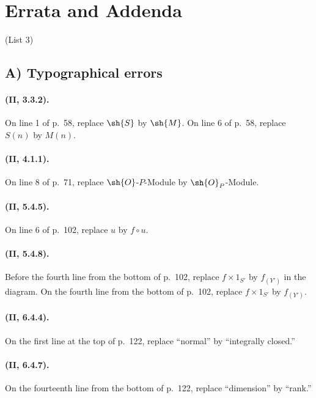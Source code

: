 \clearpage
{}
{}
\section*{Errata and Addenda}
\begin{center}\large (List 3)\end{center}

\subsection*{A) Typographical errors}

\paragraph{(II, 3.3.2).}
On line 1 of p.~58, replace $\sh{S}$ by $\sh{M}$.  On line 6 of p.~58,
replace $S(n)$ by $M(n)$.

\paragraph{(II, 4.1.1).}
On line 8 of p.~71, replace $\sh{O}$-$P$-Module by
$\sh{O}_P$-Module.

\paragraph{(II, 5.4.5).}
On line 6 of p.~102, replace $u$ by $f\circ u$.

\paragraph{(II, 5.4.8).}
Before the fourth line from the bottom of p.~102, replace
$f\times 1_{S'}$ by $f_{(Y')}$ in the diagram.  On the fourth line from
the bottom of p.~102, replace $f\times 1_{S'}$ by $f_{(Y')}$.

\paragraph{(II, 6.4.4).}
On the first line at the top of p.~122, replace ``normal'' by
``integrally closed.''

\paragraph{(II, 6.4.7).}
On the fourteenth line from the bottom of p.~122, replace ``dimension''
by ``rank.''

